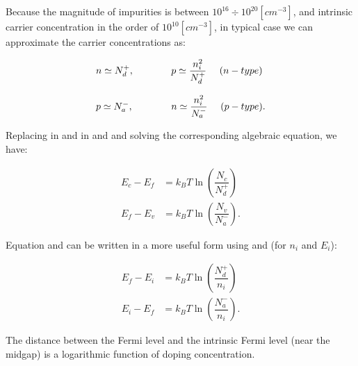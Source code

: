  Because the magnitude of impurities is between $10^{16}\div 10^{20} [cm^{-3}]$, and intrinsic carrier concentration in the order of $10^{10}[cm^{-3}]$, in typical case we can approximate the carrier concentrations as:
  
\begin{equation}
\label{eq: equilibiurm approximation}
\begin{array}{lcl}
n \simeq N_d^+,&\qquad & p \simeq \dfrac{n_i^2}{N_d^+} \psp{8} (n-type)\\ \\
p \simeq N_a^-,& \qquad & n \simeq \dfrac{n_i^2}{N_a^-} \psp{8} (p-type).
\end{array}
\end{equation}

Replacing  in   and  in  and  and solving the corresponding algebraic equation, we have:
 
 \begin{align}
 E_c-E_f & = k_B T\ln\left(\dfrac{N_c}{N_d^+}\right)  \label{eq: Ef in n-type}\\
 E_f-E_v & = k_B T\ln\left(\dfrac{N_v}{N_a^-}\right) . \label{eq: Ef in p-type}
 \end{align}

Equation  and  can be written in a more useful form using  and  (for $n_i$ and $E_i$):

 \begin{align}
 E_f-E_i & = k_B T\ln\left(\dfrac{N_d^+}{n_i}\right)  \label{eq: Ef in n-type Ei} \\
 E_i-E_f & = k_B T\ln\left(\dfrac{N_a^-}{n_i}\right).  \label{eq: Ef in p-type Ei} 
 \end{align}



\begin{Osservazione}
The distance between the Fermi level and the intrinsic Fermi level (near the midgap) is a logarithmic function of doping concentration.
\end{Osservazione}


